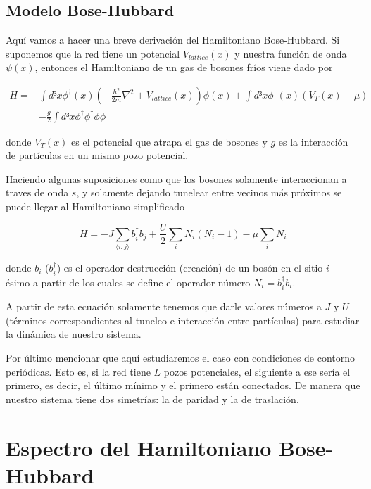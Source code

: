 \documentclass[11pt,a4paper]{article}
\begin{document}
\subsection{Modelo Bose-Hubbard}

Aquí vamos a hacer una breve derivación del Hamiltoniano Bose-Hubbard. Si suponemos que la red tiene un potencial $V_{lattice}(x)$ y nuestra función de onda $\psi(x)$, entonces el Hamiltoniano de un gas de bosones fríos viene dado por

\begin{equation}
  \begin{split}
    H = & \int d³x \phi^{\dagger}(x)(-\frac{\hbar^2}{2m}\nabla^2+V_{lattice}(x))\phi(x)+\int d³x\phi^{\dagger}(x)(V_T(x)-\mu) \\
    &-\frac{g}{2}\int d³x\phi^{\dagger}\phi^{\dagger}\phi\phi
  \end{split}
\end{equation}

donde $V_T(x)$ es el potencial que atrapa el gas de bosones y $g$ es la interacción de partículas en un mismo pozo potencial.



Haciendo algunas suposiciones como que los bosones solamente interaccionan a traves de onda $s$, y solamente dejando tunelear entre vecinos más próximos se puede llegar al Hamiltoniano simplificado


\begin{equation}
  H=-J\sum_{\langle i,j\rangle}b_i^{\dagger}b_j+\frac{U}{2}\sum_iN_i(N_i-1)-\mu\sum_iN_i
\end{equation}

donde $b_i$ ($b_i^{\dagger}$) es el operador destrucción (creación) de un bosón en el sitio $i-$\'esimo a partir de los cuales se define el operador número $N_i=b_i^{\dagger}b_i$.

A partir de esta ecuación solamente tenemos que darle valores números a $J$ y $U$ (términos correspondientes al tuneleo e interacción entre partículas) para estudiar la dinámica de nuestro sistema.


Por último mencionar que aquí estudiaremos el caso con condiciones de contorno periódicas. Esto es, si la red tiene $L$ pozos potenciales, el siguiente a ese sería el primero, es decir, el último mínimo y el primero están conectados. De manera que nuestro sistema tiene dos simetrías: la de paridad y la de traslación.


\section{Espectro del Hamiltoniano Bose-Hubbard}
\end{document}
